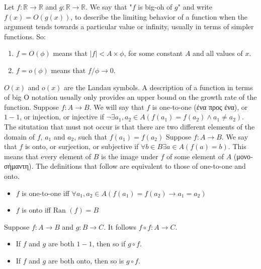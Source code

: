 \documentclass[12pt]{article}
\def\Ran{\text{Ran\ }} %
\begin{document}
\begin{flushleft}
	\textbullet \quad Let $f: \mathbb{R} \rightarrow \mathbb{R}$ and $g: \mathbb{R} \rightarrow \mathbb{R}$. We say that "$f$ is big-oh of $g$" and write $f(x) = O(g(x))$, to describe the limiting behavior of a function when the argument tends towards a particular value or infinity, usually in terms of simpler functions. So:  
	\begin{enumerate}
	\item $f= O(\phi)$ means that $|f| < A \times \phi$, for some constant $A$ and all values of $x$. 
	\item $f = o(\phi)$ means that $f/\phi \rightarrow 0$. 
	\end{enumerate}
	$O(x)$ and $o(x)$ are the Landau symbols. \linebreak 
	\textbullet \quad A description of a function in terms of big O notation usually only provides an upper bound on the growth rate of the function. \linebreak 
	\textbullet \quad Suppose $f: A \rightarrow B$. We will say that $f$ is one-to-one (\textgreek{ένα προς ένα}), or $1-1$, or injection, or injective if $\lnot \exists a_1, a_2 \in A (f(a_1) = f(a_2) \land a_1 \neq a_2) $. The situtation that must not occur is that there are two different elements of the domain of $f$, $a_1$ and $a_2$, such that $f(a_1) = f(a_2)$ \linebreak 
	\textbullet \quad Suppose $f: A \rightarrow B$. We say that $f$ is onto, or surjection, or subjective if $\forall b \in B \exists a \in A (f(a) = b) $. \linebreak This means that every element of $B$ is the image under $f$ of some element of $A$ (\textgreek{μονοσήμαντη}). \linebreak 
	The definitions that follow are equivalent to those of one-to-one and onto.  
	\begin{itemize}
		\renewcommand{\labelitemi}{$\rightarrow$}
	\item $f$ is one-to-one iff $\displaystyle \forall a_1, a_2 \in A (f(a_1) = f(a_2) \rightarrow a_1 = a_2 ) $  
	\item $f$ is onto iff $\Ran(f) = B$  
	\end{itemize}
	\textbullet \quad Suppose $f: A \rightarrow B$ and $g: B \rightarrow C$. It follows $f \circ f: A \rightarrow C $.  
	\begin{itemize}
		\renewcommand{\labelitemi}{$\rightarrow$}
	\item If $f$ and $g$ are both $1-1$, then so if $g\circ f$. 
	\item If $f$ and $g$ are both onto, then so is $g\circ f$.

\end{itemize}
\end{flushleft}
\end{document}
